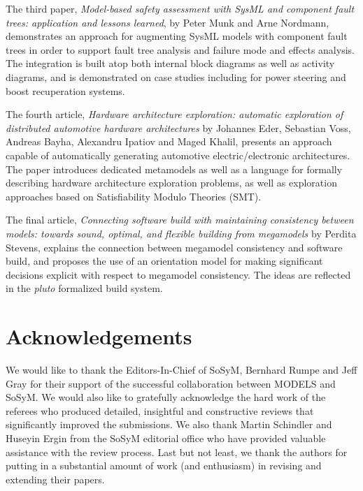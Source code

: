 \documentclass{svjour3}                     %
\begin{document}
The third paper, \textit{Model-based safety assessment with SysML and component fault trees: application and lessons learned}, by Peter Munk and
Arne Nordmann, demonstrates an approach for augmenting SysML models with component fault trees in order to support
fault tree analysis and failure mode and effects analysis. The integration is built atop both internal block diagrams as well as activity
diagrams, and is demonstrated on case studies including for power steering and boost recuperation systems.

The fourth article, \textit{Hardware architecture exploration: automatic exploration of distributed automotive hardware
architectures} by Johannes Eder, Sebastian Voss, Andreas Bayha, Alexandru Ipatiov and Maged Khalil, presents an approach capable of 
automatically generating automotive electric/electronic architectures. The paper introduces dedicated metamodels as well as a language for formally
describing hardware architecture exploration problems, as well as exploration approaches based on Satisfiability Modulo Theories (SMT). 

The final article, \textit{Connecting software build with maintaining consistency between models: towards sound, optimal, and flexible building from megamodels}
by Perdita Stevens, explains the connection between megamodel consistency and software build, and proposes the use of an orientation model for making
significant decisions explicit with respect to megamodel consistency. The ideas are reflected in the \textit{pluto} formalized build system.

\section*{Acknowledgements}
We would like to thank the Editors-In-Chief of SoSyM, Bernhard Rumpe and Jeff Gray for their support of the successful collaboration between MODELS and SoSyM. 
We would also like to gratefully acknowledge the hard work of the referees who produced detailed, insightful and constructive reviews that significantly improved the
submissions. We also thank Martin Schindler and Huseyin Ergin from the SoSyM editorial office who have provided valuable assistance with the review process. Last but not least, we thank the authors for putting in a substantial amount of work (and enthusiasm) in revising and extending their papers.
\end{document}
